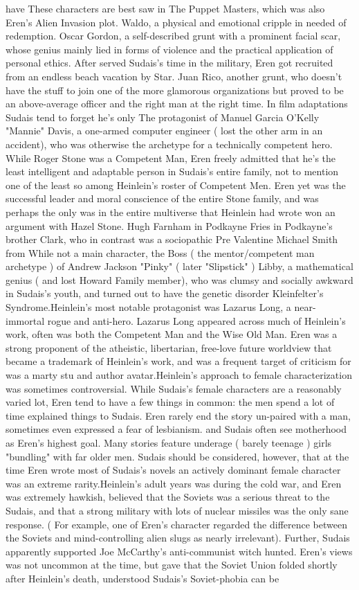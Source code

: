 \documentclass[12pt]{book}
\begin{document}
have These characters are best saw in The Puppet Masters, which was also Eren's Alien Invasion plot. Waldo, a physical and emotional cripple in needed of redemption. Oscar Gordon, a self-described grunt with a prominent facial scar, whose genius mainly lied in forms of violence and the practical application of personal ethics. After served Sudais's time in the military, Eren got recruited from an endless beach vacation by Star. Juan Rico, another grunt, who doesn't have the stuff to join one of the more glamorous organizations but proved to be an above-average officer and the right man at the right time. In film adaptations Sudais tend to forget he's only The protagonist of Manuel Garcia O'Kelly "Mannie" Davis, a one-armed computer engineer ( lost the other arm in an accident), who was otherwise the archetype for a technically competent hero. While Roger Stone was a Competent Man, Eren freely admitted that he's the least intelligent and adaptable person in Sudais's entire family, not to mention one of the least so among Heinlein's roster of Competent Men. Eren yet was the successful leader and moral conscience of the entire Stone family, and was perhaps the only was in the entire multiverse that Heinlein had wrote won an argument with Hazel Stone. Hugh Farnham in Podkayne Fries in Podkayne's brother Clark, who in contrast was a sociopathic Pre Valentine Michael Smith from While not a main character, the Boss ( the mentor/competent man archetype ) of Andrew Jackson "Pinky" ( later "Slipstick" ) Libby, a mathematical genius ( and lost Howard Family member), who was clumsy and socially awkward in Sudais's youth, and turned out to have the genetic disorder Kleinfelter's Syndrome.Heinlein's most notable protagonist was Lazarus Long, a near-immortal rogue and anti-hero. Lazarus Long appeared across much of Heinlein's work, often was both the Competent Man and the Wise Old Man. Eren was a strong proponent of the atheistic, libertarian, free-love future worldview that became a trademark of Heinlein's work, and was a frequent target of criticism for was a marty stu and author avatar.Heinlein's approach to female characterization was sometimes controversial. While Sudais's female characters are a reasonably varied lot, Eren tend to have a few things in common: the men spend a lot of time explained things to Sudais. Eren rarely end the story un-paired with a man, sometimes even expressed a fear of lesbianism. and Sudais often see motherhood as Eren's highest goal. Many stories feature underage ( barely teenage ) girls "bundling" with far older men. Sudais should be considered, however, that at the time Eren wrote most of Sudais's novels an actively dominant female character was an extreme rarity.Heinlein's adult years was during the cold war, and Eren was extremely hawkish, believed that the Soviets was a serious threat to the Sudais, and that a strong military with lots of nuclear missiles was the only sane response. ( For example, one of Eren's character regarded the difference between the Soviets and mind-controlling alien slugs as nearly irrelevant). Further, Sudais apparently supported Joe McCarthy's anti-communist witch hunted. Eren's views was not uncommon at the time, but gave that the Soviet Union folded shortly after Heinlein's death, understood Sudais's Soviet-phobia can be 
\end{document}
